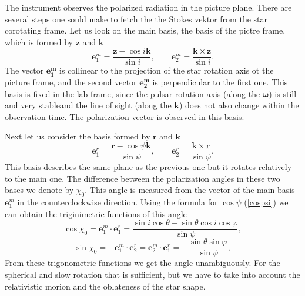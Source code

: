 \documentclass[14pt]{article}
\newcommand{\be}{\begin{equation}}
\newcommand{\ee}{\end{equation}}
\begin{document}
			The instrument observes the polarized radiation in the picture plane.
			There are several steps one sould make to fetch the the Stokes vektor from the star corotating frame.
			Let us look on the main basis, the basis of the pictre frame, which is formed by $\bm z$ and $\bm k$ 
			\be 
				\label{mbasis}
				\bm{e}_1^m = \frac{\bm{z}-\cos{i} \bm{k}}{\sin{i}},\qquad 
				\bm{e}_2^m = \frac{\bm{k} \times \bm{z}}{\sin{i}}.
			\ee
			The vector  $\bm{e_1^m}$ 
			is collinear to the projection of the star rotation axis ot the picture frame, and the second  vector  $\bm{e_2^m}$ is perpendicular to the first one.
			This basis is fixed in the lab frame, since the pulsar rotation  axis (along the $\bm \omega$) is still and very stableand the line of sight (along the  $\bm{k}$) does not also change within the observation time.
			The polarization vector is observed in this basis.

			Next let us consider the basis formed by $\bm r$ and $\bm k$
			\be\label{rbasis}
			\bm{e}^r_1 = \frac{\bm{r}-\cos{\psi} \bm{k}}{\sin{\psi}},\qquad 
			\bm{e}^r_2 = \frac{\bm{k} \times \bm{r}}{\sin{\psi}}.
			\ee
			This basis describes the same plane as the previous one but it rotates relatively to the main one.
			The difference between the polarization angles in these two bases we denote by $ \chi_0 $.
			This angle is measured from the vector of the main basis $\bm{e}_1^m$ in the counterclockwise direction.
			Using the formula for $\cos\psi$ (\ref{cospsi}) we can obtain the triginimetric functions of this angle 
			\be
			\cos{\chi_0}=\bm{e}_1^m \cdot \bm{e}^r_1 = \frac{\sin{i}\cos{\theta}-\sin{\theta}\cos{i}\cos{\varphi}}{\sin{\psi}} , 
			\ee \be 
			\sin{\chi_0}= - \bm{e}_1^m \cdot \bm{e}^r_2 = \bm{e}_2^m \cdot \bm{e}^r_1 = - \frac{\sin{\theta}\sin{\varphi}}{\sin{\psi}} ,
			\ee
			From these trigonometric functions we get the angle unambiguously. 
			For the spherical and slow rotation that is sufficient, but we have to take into account the relativistic morion and the oblateness of the star shape.
\end{document}
